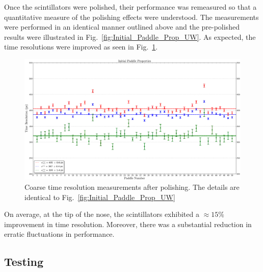 Once the scintillators were polished, their performance was remeasured so that a quantitative measure of the polishing effects were understood.  The measurements were performed in an identical manner outlined above and the pre-polished results were illustrated in Fig.~\ref{fig:Initial_Paddle_Prop_UW}. As expected, the time resolutions were improved as seen in Fig.~\ref{fig:Polished_Paddle_Prop_UW}.
	\begin{figure}[!htb]
		\centering
		\includegraphics[width=1.0\columnwidth]{fabrication/figs/Polished_Paddle_Prop_UW}
		\caption{Coarse time resolution measurements after polishing. The details are identical to Fig.~\ref{fig:Initial_Paddle_Prop_UW}}
		\label{fig:Polished_Paddle_Prop_UW}
	\end{figure}
On average, at the tip of the nose, the scintillators exhibited a $\approx15\%$ improvement in time resolution.  Moreover, there was a substantial reduction in erratic fluctuations in performance.

\subsection{Testing} \label{sec:fab_test}

